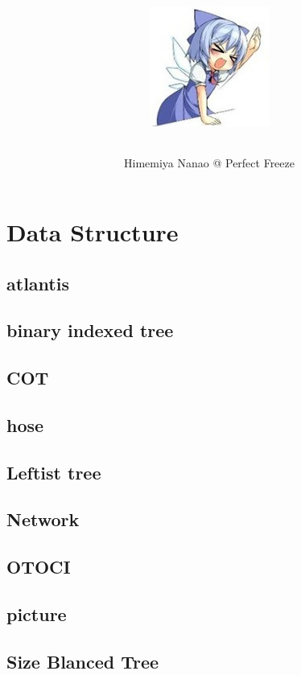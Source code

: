 \documentclass[a4paper,5pt,twocolumn,titlepage]{article}
\title{\TitleFont{Code Library}
\begin{center}
\includegraphics[scale=2]{./image1.png}
\end{center}
}
\author{Himemiya Nanao @ Perfect Freeze}
\begin{document}
\maketitle \tableofcontents
\newpage
{}


\section{Data Structure}
\subsection{atlantis}

\subsection{binary indexed tree}

\subsection{COT}

\subsection{hose}

\subsection{Leftist tree}

\subsection{Network}

\subsection{OTOCI}

\subsection{picture}

\subsection{Size Blanced Tree}

\end{document}
